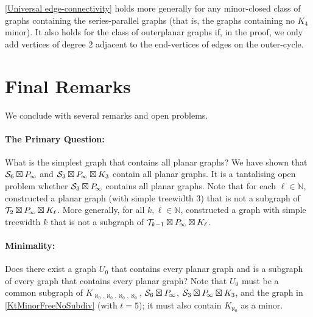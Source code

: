 \documentclass[a4paper,11pt]{article}
\theoremstyle{plain}
\theoremstyle{definition}
\newcommand{\PP}{P_{\hspace{-0.25ex}\infty}}
\newcommand{\TT}{\mathcal{T}}
\newcommand{\NN}{\mathbb{N}}
\renewcommand{\SS}{\mathcal{S}}
\begin{document}
\cref{Universal edge-connectivity} holds more generally for any minor-closed class of graphs containing the series-parallel graphs (that is, the graphs containing no $K_4$ minor). It also holds for the class of outerplanar graphs if, in the proof, we only add vertices of degree 2 adjacent to the end-vertices of edges on the outer-cycle.




\section{Final Remarks}

We conclude with several remarks and open problems.

\paragraph{The Primary Question:}
What is the simplest graph that contains all planar graphs? We have shown that $\SS_6\boxtimes \PP$ and $\SS_3\boxtimes \PP\boxtimes K_3$ contain all planar graphs. It is a tantalising open problem whether $\SS_3\boxtimes\PP$  contains all planar graphs. Note that for each $\ell\in\NN$, \citet{DJMMUW20} constructed a planar graph (with simple treewidth 3)  that is not a subgraph of $\TT_2 \boxtimes \PP \boxtimes K_{\ell}$. More generally, for all $k,\ell\in\NN$, \citet{DJMMUW20} constructed a graph with simple treewidth $k$  that is not a subgraph of $\TT_{k-1} \boxtimes \PP \boxtimes K_{\ell}$. 

\paragraph{Minimality:} 
Does there exist a graph $U_0$ that contains every planar graph and is a subgraph of every graph that contains every planar graph? Note that $U_0$ must be a common subgraph of $K_{\aleph_0,\aleph_0,\aleph_0,\aleph_0}$, 
$\SS_6 \boxtimes \PP$, $\SS_3 \boxtimes \PP \boxtimes K_3$, and the graph in \cref{KtMinorFreeNoSubdiv} (with $t=5$); it must also contain $K_{\aleph_0}$ as a minor. 
\end{document}
